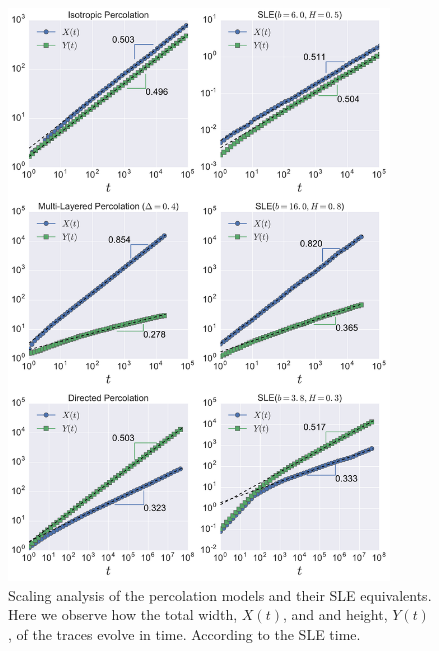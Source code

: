 \begin{figure}
\begin{center}
    \includegraphics[width=0.9\textwidth]{chapters/ch6-asle/figs/timescaling}
\end{center}
\caption{Scaling analysis of the percolation models and their SLE equivalents.
    Here we observe how the total width, $X(t)$, and and height, $Y(t)$, of the
    traces evolve in time. According to the SLE time.}
\label{fig:timescaling}
\end{figure}


